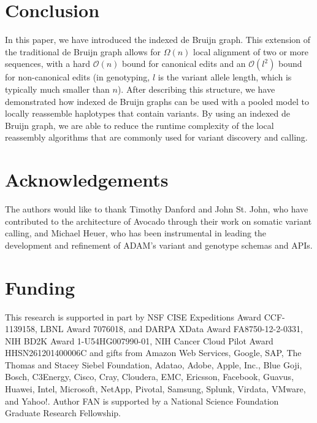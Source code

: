 \documentclass{bioinfo}
\begin{document}
\section{Conclusion}
\label{sec:conclusion}

In this paper, we have introduced the indexed de Bruijn graph. This extension of the traditional
de Bruijn graph allows for $\Omega(n)$ local alignment of two or more sequences, with a hard
$\mathcal{O}(n)$ bound for canonical edits and an $\mathcal{O}(l^2)$ bound for non-canonical edits
(in genotyping, $l$ is the variant allele length, which is typically much smaller than $n$). After describing this structure, we have demonstrated how
indexed de Bruijn graphs can be used with a pooled model to locally reassemble haplotypes that contain
variants. By using an indexed de Bruijn graph, we are able to reduce the runtime complexity of the local
reassembly algorithms that are commonly used for variant discovery and calling.

\section*{Acknowledgements}

The authors would like to thank Timothy Danford and John St. John, who have
contributed to the architecture of Avocado through their work on somatic
variant calling, and Michael Heuer, who has been instrumental in leading
the development and refinement of \textsc{ADAM}'s variant and genotype
schemas and APIs.

\section*{Funding}

This research is supported in part by NSF CISE Expeditions Award CCF-1139158,
LBNL Award 7076018, and DARPA XData Award FA8750-12-2-0331, NIH BD2K Award
1-U54HG007990-01, NIH Cancer Cloud Pilot Award HHSN261201400006C and gifts
from Amazon Web Services, Google, SAP,  The Thomas and Stacey Siebel
Foundation, Adatao, Adobe, Apple, Inc., Blue Goji, Bosch, C3Energy, Cisco,
Cray, Cloudera, EMC, Ericsson, Facebook, Guavus, Huawei, Intel, Microsoft,
NetApp, Pivotal, Samsung, Splunk, Virdata, VMware, and Yahoo!. Author FAN is
supported by a National Science Foundation Graduate Research Fellowship.

\vspace*{-12pt}


%
%
%
%
%
%
%

\end{document}
